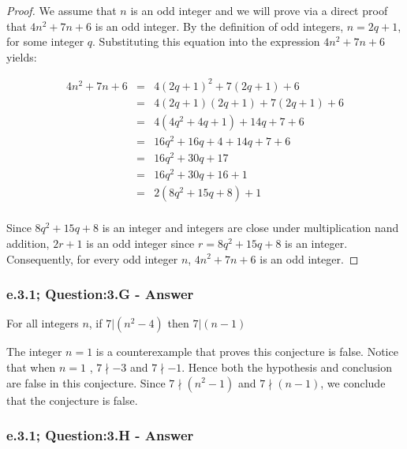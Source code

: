 \begin{proof}

We assume that $n$ is an odd integer and we will prove via a direct proof that $4n^2 + 7n + 6$ is an odd integer. By the definition of odd integers, $n = 2q + 1$, for some integer $q$. Substituting this equation into the expression $4n^2 + 7n + 6$ yields: 

	\begin{eqnarray}
	4n^2 + 7n + 6 & = & 4(2q + 1)^2 + 7(2q + 1) + 6 \nonumber \\
	& = & 4(2q + 1)(2q + 1) + 7(2q + 1) + 6 \nonumber \\
	& = & 4(4q^2 + 4q + 1) + 14q + 7 + 6 \nonumber \\
	& = & 16q^2 + 16q + 4 + 14q + 7 + 6 \nonumber \\
	& = & 16q^2 + 30q + 17 \nonumber \\
	& = & 16q^2 + 30q + 16 + 1 \nonumber \\
	& = & 2(8q^2 + 15q + 8) + 1 \nonumber \\
	\end{eqnarray}

Since $8q^2 + 15q + 8$ is an integer and integers are close under multiplication nand addition, $2r + 1$ is an odd integer since $r = 8q^2 + 15q + 8$ is an integer. Consequently, for every odd integer $n$, $4n^2 + 7n + 6$ is an odd integer. 
\end{proof}



\subsubsection*{e.3.1; Question:3.G - Answer}

\begin{tcolorbox}
	\begin{conjecture}
		For all integers $n$, if $7 |(n^2 - 4)$ then $7|(n - 1)$
	\end{conjecture}
\end{tcolorbox}

The integer $n=1$ is a counterexample that proves this conjecture is false. Notice that when $n=1$ , $7 \nmid -3$ and $7 \nmid -1$. Hence both the hypothesis and conclusion are false in this conjecture. Since $7 \nmid (n^2 - 1)$ and $7 \nmid (n - 1)$, we conclude that the conjecture is false.  



\subsubsection*{e.3.1; Question:3.H - Answer}

